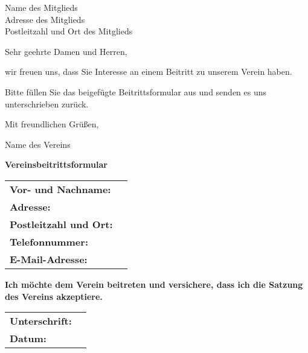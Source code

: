 \documentclass[a4paper]{scrlttr2}
\begin{document}

\begin{letter}{%
Name des Mitglieds\\
Adresse des Mitglieds\\
Postleitzahl und Ort des Mitglieds
}


\opening{Sehr geehrte Damen und Herren,}

wir freuen uns, dass Sie Interesse an einem Beitritt zu unserem Verein haben. 

Bitte füllen Sie das beigefügte Beitrittsformular aus und senden es uns unterschrieben zurück.

Mit freundlichen Grüßen,

\closing{Name des Vereins}

\end{letter}

\begin{center}
\Large\textbf{Vereinsbeitrittsformular}
\end{center}

\begin{tabular}{p{4.5cm} p{11cm}}
\textbf{Vor- und Nachname:} & \\
\textbf{Adresse:} & \\
\textbf{Postleitzahl und Ort:} & \\
\textbf{Telefonnummer:} & \\
\textbf{E-Mail-Adresse:} & \\
\end{tabular}

\begin{center}
\textbf{Ich möchte dem Verein beitreten und versichere, dass ich die Satzung des Vereins akzeptiere.}
\end{center}

\begin{tabular}{p{4.5cm} p{11cm}}
\textbf{Unterschrift:} & \\
\textbf{Datum:} & \\
\end{tabular}
\end{document}
